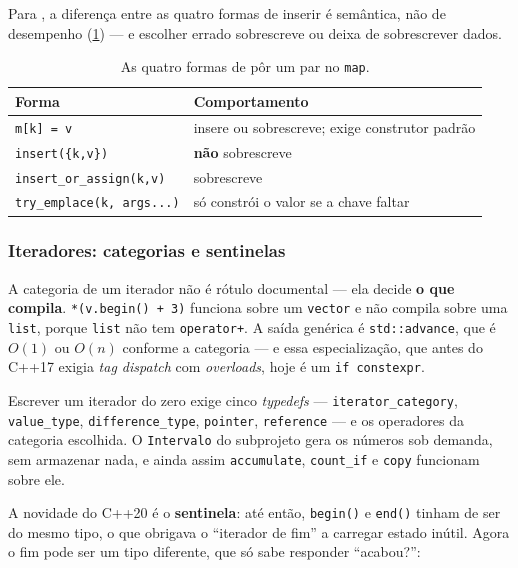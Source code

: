 Para , a diferença entre as quatro formas de inserir é
semântica, não de desempenho (\cref{tab:map-insert}) --- e escolher errado
sobrescreve ou deixa de sobrescrever dados.

\begin{table}[htbp]
\centering
\caption{As quatro formas de pôr um par no \texttt{map}.}
\label{tab:map-insert}
\footnotesize
\begin{tabular}{@{}ll@{}}
\toprule
\textbf{Forma} & \textbf{Comportamento} \\
\midrule
\texttt{m[k] = v}                & insere ou sobrescreve; exige construtor padrão \\
\texttt{insert(\{k,v\})}         & \textbf{não} sobrescreve \\
\texttt{insert\_or\_assign(k,v)} & sobrescreve \\
\texttt{try\_emplace(k, args...)}& só constrói o valor se a chave faltar \\
\bottomrule
\end{tabular}
\end{table}

\subsubsection{Iteradores: categorias e sentinelas}

A categoria de um iterador não é rótulo documental --- ela decide \textbf{o que
compila}. \texttt{*(v.begin() + 3)} funciona sobre um \texttt{vector} e não
compila sobre uma \texttt{list}, porque \texttt{list} não tem
\texttt{operator+}. A saída genérica é \texttt{std::advance}, que é $O(1)$ ou
$O(n)$ conforme a categoria --- e essa especialização, que antes do C++17 exigia
\emph{tag dispatch} com \emph{overloads}, hoje é um \texttt{if constexpr}.

Escrever um iterador do zero exige cinco \emph{typedefs} ---
\texttt{iterator\_category}, \texttt{value\_type}, \texttt{difference\_type},
\texttt{pointer}, \texttt{reference} --- e os operadores da categoria escolhida.
O \texttt{Intervalo} do subprojeto gera os números sob demanda, sem armazenar
nada, e ainda assim \texttt{accumulate}, \texttt{count\_if} e \texttt{copy}
funcionam sobre ele.

A novidade do C++20 é o \textbf{sentinela}: até então, \texttt{begin()} e
\texttt{end()} tinham de ser do mesmo tipo, o que obrigava o ``iterador de fim''
a carregar estado inútil. Agora o fim pode ser um tipo diferente, que só sabe
responder ``acabou?'':

